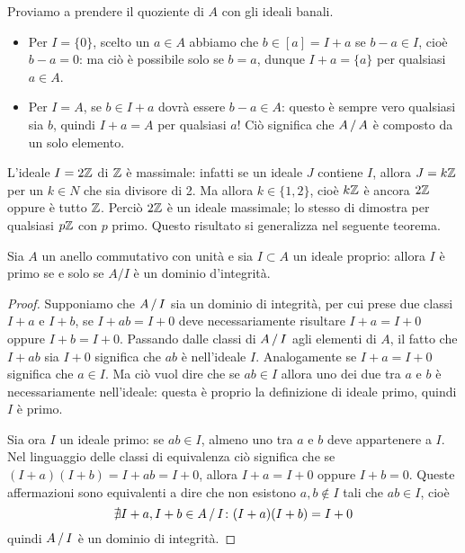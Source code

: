 Proviamo a prendere il quoziente di $A$ con gli ideali banali.
\begin{itemize}
	\item Per $I=\{0\}$, scelto un $a\in A$ abbiamo che $b\in [a]=I+a$ se $b-a\in I$, cioè $b-a=0$: ma ciò è possibile solo se $b=a$, dunque $I+a=\{a\}$ per qualsiasi $a\in A$.
	\item Per $I=A$, se $b\in I+a$ dovrà essere $b-a\in A$: questo è sempre vero qualsiasi sia $b$, quindi $I+a=A$ per qualsiasi $a$!
		Ciò significa che $A\,/\, A$ è composto da un solo elemento.
\end{itemize}

L'ideale $I=2\mathbb{Z}$ di $\mathbb{Z}$ è massimale: infatti se un ideale $J$ contiene $I$, allora $J=k\mathbb{Z}$ per un $k\in N$ che sia divisore di 2.
Ma allora $k\in\{1,2\}$, cioè $k\mathbb{Z}$ è ancora $2\mathbb{Z}$ oppure è tutto $\mathbb{Z}$.
Perciò $2\mathbb{Z}$ è un ideale massimale; lo stesso di dimostra per qualsiasi $p\mathbb{Z}$ con $p$ primo.
Questo risultato si generalizza nel seguente teorema.
\begin{teorema} \label{t:ideale-primo-quoziente-integro}
	Sia $A$ un anello commutativo con unità e sia $I\subset A$ un ideale proprio: allora $I$ è primo se e solo se $A/I$ è un dominio d'integrità.
\end{teorema}
\begin{proof}
	Supponiamo che $A\,/\, I$ sia un dominio di integrità, per cui prese due classi $I+a$ e $I+b$, se $I+ab=I+0$ deve necessariamente risultare $I+a=I+0$ oppure $I+b=I+0$.
	Passando dalle classi di $A\,/\, I$ agli elementi di $A$, il fatto che $I+ab$ sia $I+0$ significa che $ab$ è nell'ideale $I$.
	Analogamente se $I+a=I+0$ significa che $a\in I$.
	Ma ciò vuol dire che se $ab\in I$ allora uno dei due tra $a$ e $b$ è necessariamente nell'ideale: questa è proprio la definizione di ideale primo, quindi $I$ è primo.

	Sia ora $I$ un ideale primo: se $ab\in I$, almeno uno tra $a$ e $b$ deve appartenere a $I$.
	Nel linguaggio delle classi di equivalenza ciò significa che se $(I+a)(I+b)=I+ab=I+0$, allora $I+a=I+0$ oppure $I+b=0$.
	Queste affermazioni sono equivalenti a dire che non esistono $a,b\notin I$ tali che $ab\in I$, cioè
	\begin{equation*}
		\nexists I+a, I+b\in A\,/\, I\colon (I+a)(I+b)=I+0
	\end{equation*}
	quindi $A\,/\, I$ è un dominio di integrità.
\end{proof}


